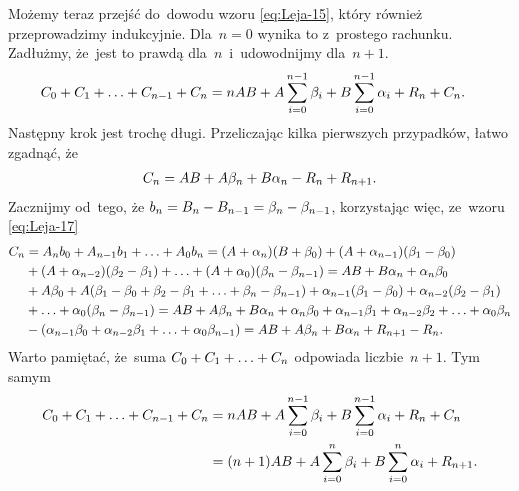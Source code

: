 \documentclass[a4paper,11pt]{article}
\begin{document}
Możemy teraz przejść do~dowodu wzoru \eqref{eq:Leja-15}, który również
przeprowadzimy indukcyjnie. Dla~$n = 0$ wynika to z~prostego rachunku.
Zadłużmy, że~jest to prawdą dla~$n$~i~udowodnijmy dla~$n + 1$.
\begin{equation}
  \label{eq:Leja-22}
  \begin{split}
    C_{ 0 } + C_{ 1 } + \ldots + C_{ n - 1 } + C_{ n } &= n AB + A \sum\limits_{
      i = 0 }^{ n - 1 } \beta_{ i } + B \sum\limits_{ i = 0 }^{ n - 1 } \alpha_{ i
    } + R_{ n } + C_{ n }.
  \end{split}
\end{equation}
Następny krok jest trochę długi. Przeliczając kilka pierwszych
przypadków, łatwo zgadnąć, że
\begin{equation}
  \label{eq:Leja-23}
  \begin{split}
    C_{ n } = AB + A \beta_{ n } + B \alpha_{ n } - R_{ n } + R_{ n + 1 }.
  \end{split}
\end{equation}
Zacznijmy od~tego, że
$b_{ n } = B_{ n } - B_{ n - 1 } = \beta_{ n } - \beta_{ n - 1 }$,
korzystając więc, ze~wzoru \eqref{eq:Leja-17}
\begin{equation}
  \label{eq:Leja-24}
  \begin{split}
    C_{ n } &= A_{ n } b_{ 0 } + A_{ n - 1 } b_{ 1 } + \ldots + A_{ 0 }
    b_{ n } = ( A + \alpha_{ n } ) ( B + \beta_{ 0 } ) + ( A + \alpha_{ n - 1
    } )
    ( \beta_{ 1 } - \beta_{ 0 } ) \\
    &+ ( A + \alpha_{ n - 2 } )( \beta_{ 2 } - \beta_{ 1 } ) + \ldots + ( A +
    \alpha_{ 0 } ) ( \beta_{ n } - \beta_{ n - 1 } )
    = AB + B \alpha_{ n } + \alpha_{ n } \beta_{ 0 } \\
    &+ A \beta_{ 0 } + A ( \beta_{ 1 } - \beta_{ 0 } + \beta_{ 2 } - \beta_{ 1 }
    + \ldots + \beta_{ n } - \beta_{ n - 1 } ) + \alpha_{ n - 1 } ( \beta_{ 1 } -
    \beta_{ 0 } )
    + \alpha_{ n - 2 } ( \beta_{ 2 } - \beta_{ 1 } ) \\
    & + \ldots + \alpha_{ 0 } ( \beta_{ n } - \beta_{ n - 1 } ) = AB + A \beta_{ n
    } + B \alpha_{ n } + \alpha_{ n } \beta_{ 0 } + \alpha_{ n - 1 } \beta_{ 1 } +
    \alpha_{ n - 2 } \beta_{ 2 } + \ldots + \alpha_{ 0 } \beta_{ n } \\
    & - ( \alpha_{ n - 1 } \beta_{ 0 } + \alpha_{ n - 2 } \beta_{ 1 } + \ldots +
    \alpha_{ 0 } \beta_{ n - 1 } ) = AB + A \beta_{ n } + B \alpha_{ n } + R_{ n
      + 1 } - R_{ n }.
  \end{split}
\end{equation}
Warto pamiętać, że~suma $C_{ 0 } + C_{ 1 } + \ldots + C_{ n }$ odpowiada
liczbie~$n + 1$. Tym samym
\begin{equation}
  \label{eq:Leja-25}
  \begin{split}
    C_{ 0 } + C_{ 1 } + \ldots + C_{ n - 1 } + C_{ n } &= n AB + A \sum\limits_{
      i = 0 }^{ n - 1 } \beta_{ i } + B \sum\limits_{ i = 0 }^{ n - 1 } \alpha_{ i
    } + R_{ n } + C_{ n } \\
    &= ( n + 1 ) AB + A \sum\limits_{ i = 0 }^{ n } \beta_{ i } + B \sum\limits_{ i =
      0 }^{ n } \alpha_{ i } + R_{ n + 1 }.
  \end{split}
\end{equation}
\end{document}
